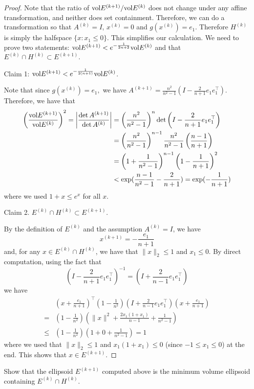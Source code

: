 \begin{proof}
Note that the ratio of $\mathrm{vol} E^{(k+1)}/\mathrm{vol} E^{(k)}$ does not change
under any affine transformation, and neither does set containment.
Therefore, we can do a transformation so that $A^{(k)}=I$, $x^{(k)}=0$
and $g(x^{(k)})=e_{1}$. Therefore $H^{(k)}$ is simply the halfspace
$\{x:x_{1}\le0\}$. This simplifies our calculation. We need to prove
two statements: $\mathrm{vol} E^{(k+1)}<e^{-\frac{1}{2n+2}}\mathrm{vol} E^{(k)}$
and that $E^{(k)}\cap H^{(k)}\subset E^{(k+1)}$.

Claim 1: $\mathrm{vol} E^{(k+1)}<e^{-\frac{1}{2(n+1)}}\mathrm{vol} E^{(k)}$.

Note that since $g(x^{(k)})=e_{1},$ we have $A^{(k+1)}=\frac{n^{2}}{n^{2}-1}\left(I-\frac{2}{n+1}e_{1}e^{\top}_{1}\right)$.
Therefore, we have that
\begin{align*}
\left(\frac{\mathrm{vol} E^{(k+1)}}{\mathrm{vol} E^{(k)}}\right)^{2}=\left|\frac{\det A^{(k+1)}}{\det A^{(k)}}\right| & =\left(\frac{n^{2}}{n^{2}-1}\right)^{n}\det\left(I-\frac{2}{n+1}e_{1}e^{\top}_{1}\right)\\
 & =\left(\frac{n^{2}}{n^{2}-1}\right)^{n-1}\frac{n^{2}}{n^{2}-1}\left(\frac{n-1}{n+1}\right)\\
 & =\left(1+\frac{1}{n^{2}-1}\right)^{n-1}\left(1-\frac{1}{n+1}\right)^{2}\\
 & <\exp(\frac{n-1}{n^{2}-1}-\frac{2}{n+1})=\exp(-\frac{1}{n+1})
\end{align*}
where we used $1+x\leq e^{x}$ for all $x$.

Claim 2. $E^{(k)}\cap H^{(k)}\subset E^{(k+1)}$.

By the definition of $E^{(k)}$ and the assumption $A^{(k)}=I$, we
have 
\[
x^{(k+1)}=-\frac{e_{1}}{n+1}
\]
and, for any $x\in E^{(k)}\cap H^{(k)}$, we have that $\|x\|_{2}\leq1$
and $x_{1}\leq0$. By direct computation, using the fact that 
\[
\left(I-\frac{2}{n+1}e_{1}e^{\top}_{1}\right)^{-1}=\left(I+\frac{2}{n-1}e_{1}e^{\top}_{1}\right)
\]
we have
\begin{align*}
 & (x+\frac{e_{1}}{n+1})^{\top}\left(1-\frac{1}{n^{2}}\right)\left(I+\frac{2}{n-1}e_{1}e^{\top}_{1}\right)(x+\frac{e_{1}}{n+1})\\
= & \left(1-\frac{1}{n^{2}}\right)\left(\|x\|^{2}+\frac{2x_{1}(1+x_{1})}{n-1}+\frac{1}{n^{2}-1}\right)\\
\leq & \left(1-\frac{1}{n^{2}}\right)\left(1+0+\frac{1}{n^{2}-1}\right)=1
\end{align*}
where we used that $\|x\|_{2}\leq1$ and $x_{1}(1+x_{1})\leq0$ (since
$-1\leq x_{1}\leq0$) at the end. This shows that $x\in E^{(k+1)}$.
\end{proof}
\begin{xca}
Show that the ellipsoid $E^{(k+1)}$ computed above is the minimum
volume ellipsoid containing $E^{(k)}\cap H^{(k)}$.
\end{xca}

